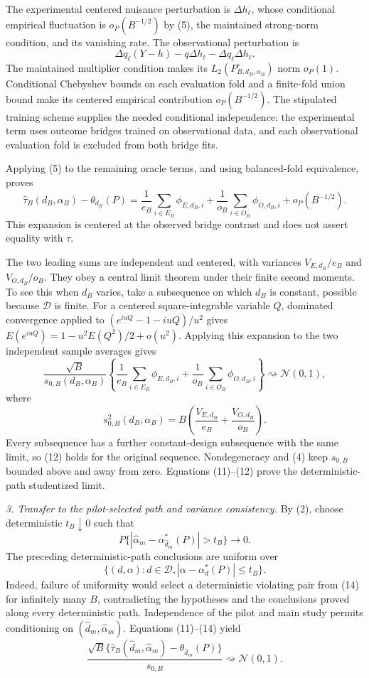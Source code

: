 The experimental centered nuisance perturbation is \(\Delta h_\ell\), whose conditional empirical fluctuation is \(o_P(B^{-1/2})\) by (5), the maintained strong-norm condition, and its vanishing rate.  The observational perturbation is
\[
 \Delta q_\ell(Y-h)-q\Delta h_\ell-\Delta q_\ell\Delta h_\ell. \tag{10}
\]
The maintained multiplier condition makes its \(L_2(P_{B,d_B,\alpha_B}^{\circ})\) norm \(o_P(1)\).  Conditional Chebyshev bounds on each evaluation fold and a finite-fold union bound make its centered empirical contribution \(o_P(B^{-1/2})\).  The stipulated training scheme supplies the needed conditional independence: the experimental term uses outcome bridges trained on observational data, and each observational evaluation fold is excluded from both bridge fits.

Applying (5) to the remaining oracle terms, and using balanced-fold equivalence, proves
\[
 \widehat\tau_B(d_B,\alpha_B)-\theta_{d_B}(P)
 =\frac1{e_B}\sum_{i\in E_B}\phi_{E,d_B,i}
 +\frac1{o_B}\sum_{i\in O_B}\phi_{O,d_B,i}
 +o_P(B^{-1/2}). \tag{11}
\]
This expansion is centered at the observed bridge contrast and does not assert equality with \(\tau\).

The two leading sums are independent and centered, with variances \(V_{E,d_B}/e_B\) and \(V_{O,d_B}/o_B\).  They obey a central limit theorem under their finite second moments.  To see this when \(d_B\) varies, take a subsequence on which \(d_B\) is constant, possible because \(\mathcal D\) is finite.  For a centered square-integrable variable \(Q\), dominated convergence applied to \((e^{iuQ}-1-iuQ)/u^2\) gives \(E(e^{iuQ})=1-u^2E(Q^2)/2+o(u^2)\).  Applying this expansion to the two independent sample averages gives
\[
 \frac{\sqrt B}{s_{0,B}(d_B,\alpha_B)}
 \left\{
 \frac1{e_B}\sum_{i\in E_B}\phi_{E,d_B,i}
 +\frac1{o_B}\sum_{i\in O_B}\phi_{O,d_B,i}
 \right\}
 \rightsquigarrow\mathcal N(0,1), \tag{12}
\]
where
\[
 s_{0,B}^2(d_B,\alpha_B)
 =B\left(\frac{V_{E,d_B}}{e_B}+\frac{V_{O,d_B}}{o_B}\right).
\]
Every subsequence has a further constant-design subsequence with the same limit, so (12) holds for the original sequence.  Nondegeneracy and (4) keep \(s_{0,B}\) bounded above and away from zero.  Equations (11)--(12) prove the deterministic-path studentized limit.

\emph{3. Transfer to the pilot-selected path and variance consistency.}
By (2), choose deterministic \(t_B\downarrow0\) such that
\[
 P\{|\widehat\alpha_m-\alpha_{\widehat d_m}^*(P)|>t_B\}\longrightarrow0. \tag{13}
\]
The preceding deterministic-path conclusions are uniform over
\[
 \{(d,\alpha):d\in\mathcal D,
 |\alpha-\alpha_d^*(P)|\le t_B\}. \tag{14}
\]
Indeed, failure of uniformity would select a deterministic violating pair from (14) for infinitely many \(B\), contradicting the hypotheses and the conclusions proved along every deterministic path.  Independence of the pilot and main study permits conditioning on \((\widehat d_m,\widehat\alpha_m)\).  Equations (11)--(14) yield
\[
 \frac{\sqrt B\{\widehat\tau_B(\widehat d_m,\widehat\alpha_m)
 -\theta_{\widehat d_m}(P)\}}{s_{0,B}}
 \rightsquigarrow\mathcal N(0,1). \tag{15}
\]

